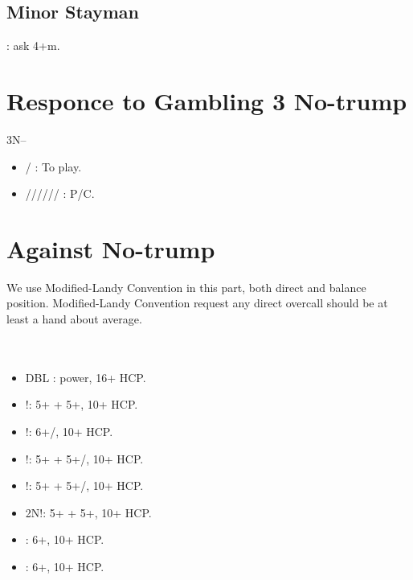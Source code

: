\documentclass[12pt,twoside,a5paper]{report}%
\begin{document}
	\section*{Minor Stayman}
	 : ask 4+m.

\chapter*{Responce to Gambling 3 No-trump}
	3N--\\
	\begin{itemize}
	\renewcommand{\labelitemi}{}
	\item {}/ : To play.
	\item {}////// : P/C.
	\end{itemize}

\chapter*{Against No-trump}
		We use Modified-Landy Convention in this part, both direct and balance position. Modified-Landy Convention request any direct overcall should be at least a hand about average.\\
		\\
		\\
		\begin{itemize}
		\renewcommand{\labelitemi}{--}
			\item DBL : power, 16+ HCP.
			\item {}!: 5+\sp{} + 5+\he{}, 10+ HCP.
			\item {}!: 6+\sp{}/\he{}, 10+ HCP.
			\item {}!: 5+\he{} + 5+\cl{}/\di{}, 10+ HCP.
			\item {}!: 5+\sp{} + 5+\cl{}/\di{}, 10+ HCP.
			\item 2N!: 5+\cl{} + 5+\di{}, 10+ HCP.
			\item {} : 6+\cl{}, 10+ HCP.
			\item {} : 6+\di{}, 10+ HCP.
		\end{itemize}
\end{document}
